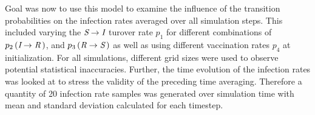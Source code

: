 Goal was now to use this model to examine the influence of the transition probabilities on the infection rates averaged over all simulation steps. This included varying the $\textit{S}\rightarrow\textit{I}$ turover rate $p_1$
for different combinations of $p_2\left(\textit{I}\rightarrow\textit{R}\,\right)$, and $p_3\left(\textit{R}\rightarrow\textit{S}\,\right)$ as well as using different vaccination rates $p_4$ at initialization. 
For all simulations, different grid sizes were used to observe potential statistical inaccuracies.\newline
Further, the time evolution of the infection rates was looked at to stress the validity of the preceding time averaging. Therefore a quantity of 20 infection rate samples was generated over simulation time
with mean and standard deviation calculated for each timestep.